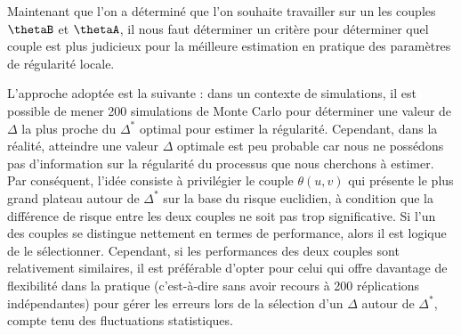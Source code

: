 
Maintenant que l'on a déterminé que l'on souhaite travailler sur un les couples $\thetaB$ et $\thetaA$, il nous faut déterminer un critère pour déterminer quel couple est plus judicieux pour la méilleure estimation en pratique des paramètres de régularité locale.

L'approche adoptée est la suivante : dans un contexte de simulations, il est possible de mener 200 simulations de Monte Carlo pour déterminer une valeur de $\Delta$ la plus proche du $\Delta^*$ optimal pour estimer la régularité. Cependant, dans la réalité, atteindre une valeur $\Delta$ optimale est peu probable car nous ne possédons pas d'information sur la régularité du processus que nous cherchons à estimer. Par conséquent, l'idée consiste à privilégier le couple $\theta(u,v)$ qui présente le plus grand plateau autour de $\Delta^*$ sur la base du risque euclidien, à condition que la différence de risque entre les deux couples ne soit pas trop significative. Si l'un des couples se distingue nettement en termes de performance, alors il est logique de le sélectionner. Cependant, si les performances des deux couples sont relativement similaires, il est préférable d'opter pour celui qui offre davantage de flexibilité dans la pratique (c'est-à-dire sans avoir recours à 200 réplications indépendantes) pour gérer les erreurs lors de la sélection d'un $\Delta$ autour de $\Delta^*$, compte tenu des fluctuations statistiques.


